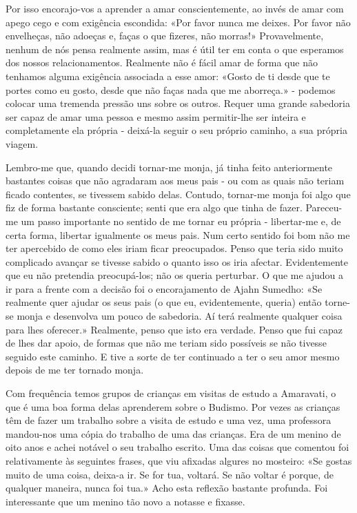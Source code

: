 Por isso encorajo-vos a aprender a amar conscientemente, ao invés de
amar com apego cego e com exigência escondida: «Por favor nunca me
deixes. Por favor não envelheças, não adoeças e, faças o que fizeres,
não morras!» Provavelmente, nenhum de nós pensa realmente assim, mas é
útil ter em conta o que esperamos dos nossos relacionamentos. Realmente
não é fácil amar de forma que não tenhamos alguma exigência associada a
esse amor: «Gosto de ti desde que te portes como eu gosto, desde que não
faças nada que me aborreça.» - podemos colocar uma tremenda pressão uns
sobre os outros. Requer uma grande sabedoria ser capaz de amar uma
pessoa e mesmo assim permitir-lhe ser inteira e completamente ela
própria - deixá-la seguir o seu próprio caminho, a sua própria viagem.

Lembro-me que, quando decidi tornar-me monja, já tinha feito
anteriormente bastantes coisas que não agradaram aos meus pais - ou com
as quais não teriam ficado contentes, se tivessem sabido delas. Contudo,
tornar-me monja foi algo que fiz de forma bastante consciente; senti que
era algo que tinha de fazer. Pareceu-me um passo importante no sentido
de me tornar eu própria - libertar-me e, de certa forma, libertar
igualmente os meus pais. Num certo sentido foi bom não me ter apercebido
de como eles iriam ficar preocupados. Penso que teria sido muito
complicado avançar se tivesse sabido o quanto isso os iria afectar.
Evidentemente que eu não pretendia preocupá-los; não os queria
perturbar. O que me ajudou a ir para a frente com a decisão foi o
encorajamento de Ajahn Sumedho: «Se realmente quer ajudar os seus pais
(o que eu, evidentemente, queria) então torne-se monja e desenvolva um
pouco de sabedoria. Aí terá realmente qualquer coisa para lhes
oferecer.» Realmente, penso que isto era verdade. Penso que fui capaz de
lhes dar apoio, de formas que não me teriam sido possíveis se não
tivesse seguido este caminho. E tive a sorte de ter continuado a ter o
seu amor mesmo depois de me ter tornado monja.

Com frequência temos grupos de crianças em visitas de estudo a
Amaravati, o que é uma boa forma delas aprenderem sobre o Budismo. Por
vezes as crianças têm de fazer um trabalho sobre a visita de estudo e
uma vez, uma professora mandou-nos uma cópia do trabalho de uma das
crianças. Era de um menino de oito anos e achei notável o seu trabalho
escrito. Uma das coisas que comentou foi relativamente às seguintes
frases, que viu afixadas algures no mosteiro: «Se gostas muito de uma
coisa, deixa-a ir. Se for tua, voltará. Se não voltar é porque, de
qualquer maneira, nunca foi tua.» Acho esta reflexão bastante profunda.
Foi interessante que um menino tão novo a notasse e fixasse.

